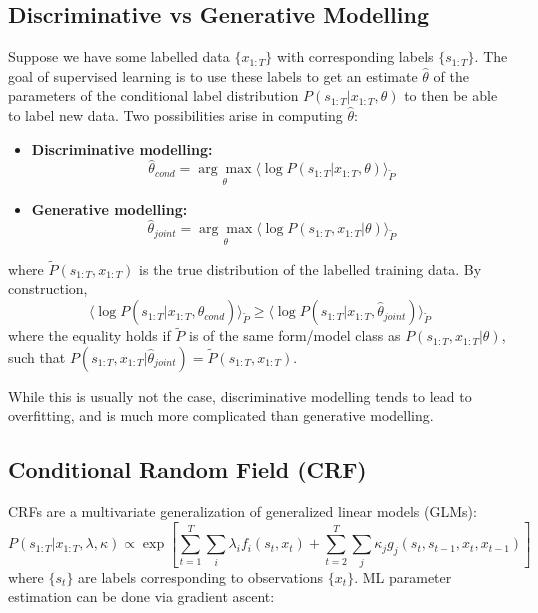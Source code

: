 \documentclass[a4paper]{article}
\begin{document}
\subsection{Discriminative vs Generative Modelling}
Suppose we have some labelled data $\{x_{1:T}\}$ with corresponding labels $\{s_{1:T}\}$. The goal of supervised learning is to use these labels to get an estimate $\hat{\theta}$ of the parameters of the conditional label distribution $P(s_{1:T}|x_{1:T},\theta)$ to then be able to label new data. Two possibilities arise in computing $\hat{\theta}$:
\begin{itemize}
\item \textbf{Discriminative modelling:}
\[ \hat{\theta}_{cond} = \underset{\theta}{\arg\max} \langle \log P(s_{1:T}|x_{1:T},\theta) \rangle_{\tilde{P}}\]
\item \textbf{Generative modelling:}
\[ \hat{\theta}_{joint} = \underset{\theta}{\arg\max} \langle \log P(s_{1:T},x_{1:T}|\theta) \rangle_{\tilde{P}} \]
\end{itemize}
where $\tilde{P}(s_{1:T},x_{1:T})$ is the true distribution of the labelled training data. By construction,
\[ \langle \log P(s_{1:T}|x_{1:T},\hat{\theta}_{cond}) \rangle_{\tilde{P}} \geq \langle \log P(s_{1:T}|x_{1:T},\hat{\theta}_{joint}) \rangle_{\tilde{P}} \]
where the equality holds if $\tilde{P}$ is of the same form/model class as $P(s_{1:T},x_{1:T}|\theta)$, such that $P(s_{1:T},x_{1:T}|\hat{\theta}_{joint}) = \tilde{P}(s_{1:T},x_{1:T})$.

While this is usually not the case, discriminative modelling tends to lead to overfitting, and is much more complicated than generative modelling.

\subsection{Conditional Random Field (CRF)}
CRFs are a multivariate generalization of generalized linear models (GLMs):
\[ P(s_{1:T}|x_{1:T},\lambda,\kappa) \propto \exp\left[\sum_{t=1}^T \sum_i \lambda_i f_i(s_t,x_t) + \sum_{t=2}^T \sum_j \kappa_j g_j(s_t,s_{t-1},x_t,x_{t-1}) \right] \]
where $\{s_t\}$ are labels corresponding to observations $\{x_t\}$. ML parameter estimation can be done via gradient ascent:


\end{document}
